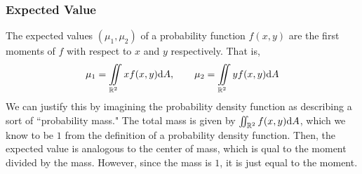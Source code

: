 \subsubsection{Expected Value}
The expected values $(\mu_1, \mu_2)$ of a probability function $f(x,y)$ are the first moments of $f$ with respect to $x$ and $y$ respectively. That is,
\begin{align*}
    \mu_1 = \iint\limits_{\mathbb{R}^2}xf(x,y)\dd A, \qquad \mu_2 = \iint\limits_{\mathbb{R}^2}yf(x,y)\dd A 
\end{align*}
We can justify this by imagining the probability density function as describing a sort of ``probability mass." The total mass is given by \( \iint_{\mathbb{R}^2}f(x,y)\dd A \), which we know to be $1$ from the definition of a probability density function. Then, the expected value is analogous to the center of mass, which is qual to the moment divided by the mass. However, since the mass is $1$, it is just equal to the moment.
